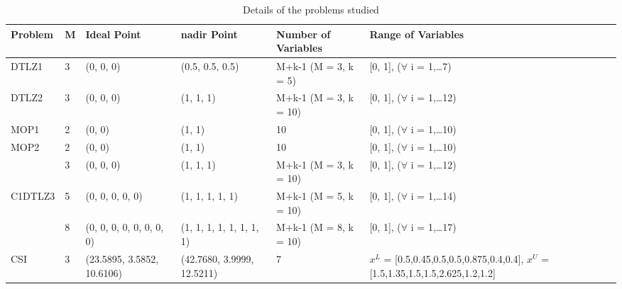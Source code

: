 \begin{table*}\scriptsize
	\centering
	\caption{Details of the problems studied}
	\label{tab:prob_param}
	\begin{tabular}{|l|l|p{3cm}|p{3cm}|p{3cm}|p{4cm}|}
		\noalign{\smallskip}\hline
		\textbf{Problem}            & \textbf{M} & \textbf{Ideal Point}                             & \textbf{nadir Point}                                                    & \textbf{Number of Variables}                         & \textbf{Range of Variables}             \\ \hline
		DTLZ1										& 3          & (0, 0, 0)                 & (0.5, 0.5, 0.5)                                                & M+k-1 (M = 3, k = 5)                                & {[}0, 1{]}, ($\forall$ i = 1,\dots 7)  \\ \hline
		DTLZ2										& 3          & (0, 0, 0)                 & (1, 1, 1)                                                & M+k-1 (M = 3, k = 10)                                & {[}0, 1{]}, ($\forall$ i = 1,\dots 12)  \\ \hline
		MOP1										& 2          & (0, 0)                 & (1, 1)                                                & 10                               & {[}0, 1{]}, ($\forall$ i = 1,\dots 10)  \\ \hline
		MOP2										& 2          & (0, 0)                 & (1, 1)                                                & 10                               & {[}0, 1{]}, ($\forall$ i = 1,\dots 10)  \\ \hline
		& 3          & (0, 0, 0)                                        & (1, 1, 1)                                                         & M+k-1 (M = 3, k = 10)                                 & {[}0, 1{]}, ($\forall$ i = 1,\dots 12)   \\ \cline{2-6}
		C1DTLZ3                     & 5          & (0, 0, 0, 0, 0)                                  & (1, 1, 1, 1, 1)                                               & M+k-1 (M = 5, k = 10)                                 & {[}0, 1{]}, ($\forall$ i = 1,\dots 14)   \\ \cline{2-6}
		& 8          & (0, 0, 0, 0, 0, 0, 0, 0)                         & (1, 1, 1, 1, 1, 1, 1, 1)                                & M+k-1 (M = 8, k = 10)                                 & {[}0, 1{]}, ($\forall$ i = 1,\dots 17)  \\ \hline
		CSI										& 3          & (23.5895, 3.5852, 10.6106)                 & (42.7680, 3.9999, 12.5211)                                                & 7                                & $x^{L}$ = [0.5,0.45,0.5,0.5,0.875,0.4,0.4], $x^{U}$ = [1.5,1.35,1.5,1.5,2.625,1.2,1.2]  \\ \hline

\end{tabular}
\end{table*}
